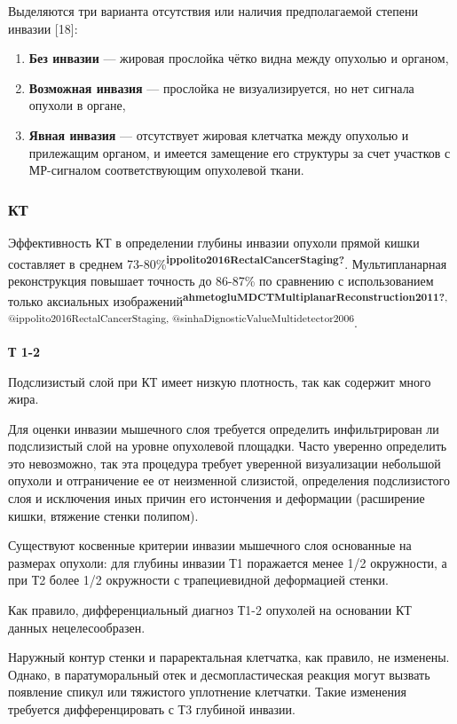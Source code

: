 \documentclass[
  russian,
  12pt,
  a4paper,
]{report}
\begin{document}
Выделяются три варианта отсутствия или наличия предполагаемой степени
инвазии {[}18{]}:

\begin{enumerate}
\def\labelenumi{\arabic{enumi}.}
\item
  \textbf{Без инвазии} --- жировая прослойка чётко видна между опухолью
  и органом,
\item
  \textbf{Возможная инвазия} --- прослойка не визуализируется, но нет
  сигнала опухоли в органе,
\item
  \textbf{Явная инвазия} --- отсутствует жировая клетчатка между
  опухолью и прилежащим органом, и имеется замещение его структуры за
  счет участков с МР-сигналом соответствующим опухолевой ткани.
\end{enumerate}

\subsubsection{КТ}\label{ux43aux442}

Эффективность КТ в определении глубины инвазии опухоли прямой кишки
составляет в среднем
73-80\%\textsuperscript{\textbf{ippolito2016RectalCancerStaging?}}.
Мультипланарная реконструкция повышает точность до 86-87\% по сравнению
с использованием только аксиальных
изображений\textsuperscript{\textbf{ahmetogluMDCTMultiplanarReconstruction2011?},
@ippolito2016RectalCancerStaging,
@sinhaDignosticValueMultidetector2006}.

\textbf{Т 1-2}

Подслизистый слой при КТ имеет низкую плотность, так как содержит много
жира.

Для оценки инвазии мышечного слоя требуется определить инфильтрирован ли
подслизистый слой на уровне опухолевой площадки. Часто уверенно
определить это невозможно, так эта процедура требует уверенной
визуализации небольшой опухоли и отграничение ее от неизменной
слизистой, определения подслизистого слоя и исключения иных причин его
истончения и деформации (расширение кишки, втяжение стенки полипом).

Существуют косвенные критерии инвазии мышечного слоя основанные на
размерах опухоли: для глубины инвазии Т1 поражается менее 1/2
окружности, а при Т2 более 1/2 окружности с трапециевидной деформацией
стенки.

Как правило, дифференциальный диагноз Т1-2 опухолей на основании КТ
данных нецелесообразен.

Наружный контур стенки и параректальная клетчатка, как правило, не
изменены. Однако, в паратуморальный отек и десмопластическая реакция
могут вызвать появление спикул или тяжистого уплотнение клетчатки. Такие
изменения требуется дифференцировать с Т3 глубиной инвазии.
\end{document}

